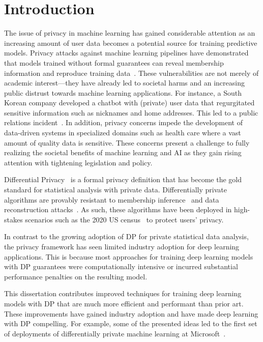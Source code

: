 \chapter{Introduction}

The issue of privacy in machine learning has gained considerable attention as an increasing amount of user data becomes a potential source for training predictive models.
Privacy attacks against machine learning pipelines have demonstrated that models trained without formal guarantees can reveal membership information and reproduce training data~\citep{shokri2017membership,carlini2021extracting}.
These vulnerabilities are not merely of academic interest---they have already led to societal harms and an increasing public distrust towards machine learning applications.
For instance, a South Korean company developed a chatbot with (private) user data that regurgitated sensitive information such as nicknames and home addresses. This led to a public relations incident~\citep{sk-chatbot}.
In addition, privacy concerns impede the development of data-driven systems in specialized domains such as health care where a vast amount of quality data is sensitive.
These concerns present a challenge to fully realizing the societal benefits of machine learning and AI as they gain rising attention with tightening legislation and policy.

Differential Privacy~\cite[DP]{dwork2014algorithmic} is a formal privacy definition that has become the gold standard for statistical analysis with private data.
Differentially private algorithms are provably resistant to membership inference~\citep{yeom2018privacy,wasserman2010statistical} and data reconstruction attacks~\citep{pmlr-v162-guo22c,hayes2023bounding}.
As such, these algorithms have been deployed in high-stakes scenarios such as the 2020 US census~\citep{us-census} to protect users' privacy.

In contrast to the growing adoption of DP for private statistical data analysis, the privacy framework has seen limited industry adoption for deep learning applications.
This is because most approaches for training deep learning models with DP guarantees were computationally intensive or incurred substantial performance penalties on the resulting model.

This dissertation contributes improved techniques for training deep learning models with DP that are much more efficient and performant than prior art.
These improvements have gained industry adoption and have made deep learning with DP compelling.
For example, some of the presented ideas led to the first set of deployments of differentially private machine learning at Microsoft~\citep{yue-etal-2023-synthetic,yu2023selective}.

